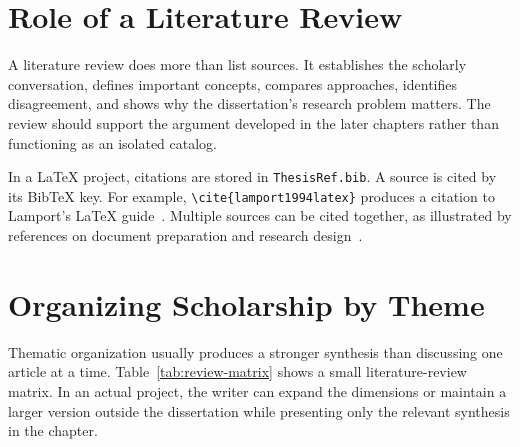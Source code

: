 \section{Role of a Literature Review}

A literature review does more than list sources. It establishes the scholarly conversation, defines important concepts, compares approaches, identifies disagreement, and shows why the dissertation's research problem matters. The review should support the argument developed in the later chapters rather than functioning as an isolated catalog.

In a LaTeX project, citations are stored in \texttt{ThesisRef.bib}. A source is cited by its BibTeX key. For example, \verb|\cite{lamport1994latex}| produces a citation to Lamport's LaTeX guide~\cite{lamport1994latex}. Multiple sources can be cited together, as illustrated by references on document preparation and research design~\cite{mittelbach2023latex,booth2016craft}.

\section{Organizing Scholarship by Theme}

Thematic organization usually produces a stronger synthesis than discussing one article at a time. Table~\ref{tab:review-matrix} shows a small literature-review matrix. In an actual project, the writer can expand the dimensions or maintain a larger version outside the dissertation while presenting only the relevant synthesis in the chapter.

\begin{table}[ht]
\centering
\caption{Example matrix for organizing a literature review.}
\label{tab:review-matrix}
\footnotesize
{}
\end{table}

